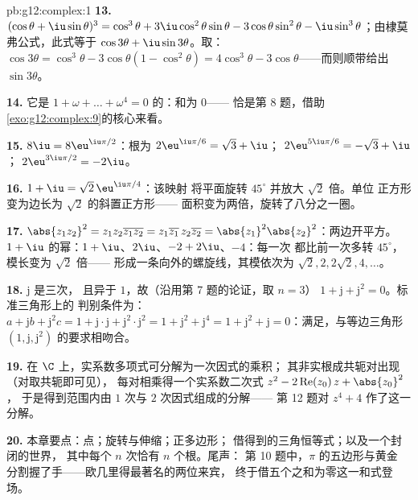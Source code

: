 \begin{solution}{pb:g12:complex:1}
\textbf{13.} $(\cos\theta + \iu\sin\theta)^3 = \cos^3\theta +
3\iu\cos^2\theta\sin\theta - 3\cos\theta\sin^2\theta -
\iu\sin^3\theta$；由棣莫弗公式，此式等于
$\cos 3\theta + \iu \sin 3\theta$。取：
$\cos 3\theta = \cos^3\theta - 3\cos\theta(1 - \cos^2\theta)
= 4\cos^3\theta - 3\cos\theta$——而则顺带给出
$\sin 3\theta$。

\textbf{14.} 它是
$1 + \omega + \dots + \omega^4 = 0$ 的：和为 $0$——
恰是第 8 题，借助
\cref{exo:g12:complex:9}的核心来看。

\textbf{15.} $8\iu = 8\eu^{\iu\pi/2}$：根为
$2\eu^{\iu\pi/6} = \sqrt3 + \iu$；
$2\eu^{5\iu\pi/6} = -\sqrt3 + \iu$；
$2\eu^{3\iu\pi/2} = -2\iu$。

\textbf{16.} $1 + \iu = \sqrt2\,\eu^{\iu\pi/4}$：该映射
将平面旋转 $45^\circ$ 并放大 $\sqrt2$ 倍。单位
正方形变为边长为 $\sqrt2$ 的斜置正方形——
面积变为两倍，旋转了八分之一圈。

\textbf{17.} $\abs{z_1 z_2}^2 = z_1 z_2 \overline{z_1 z_2} =
z_1\overline{z_1}\, z_2\overline{z_2} =
\abs{z_1}^2\abs{z_2}^2$：两边开平方。
$1 + \iu$ 的幂：$1 + \iu$、$2\iu$、$-2 + 2\iu$、$-4$：每一次
都比前一次多转 $45^\circ$，模长变为 $\sqrt2$ 倍——
形成一条向外的螺旋线，其模依次为
$\sqrt2, 2, 2\sqrt2, 4, \dots$。

\textbf{18.} $\mathrm{j}$ 是三次，
且异于 $1$，故（沿用第 7 题的论证，取 $n = 3$）
$1 + \mathrm{j} + \mathrm{j}^2 = 0$。标准三角形上的
判别条件为：$a + \mathrm{j}b + \mathrm{j}^2 c = 1 +
\mathrm{j}\cdot\mathrm{j} + \mathrm{j}^2 \cdot \mathrm{j}^2 =
1 + \mathrm{j}^2 + \mathrm{j}^4 = 1 + \mathrm{j}^2 +
\mathrm{j} = 0$：满足，与等边三角形
$\left(1, \mathrm{j}, \mathrm{j}^2\right)$ 的要求相吻合。

\textbf{19.} 在 $\C$ 上，实系数多项式可分解为一次因式的乘积；
其非实根成共轭对出现（对取共轭即可见），
每对相乘得一个实系数二次式
$z^2 - 2\operatorname{Re}(z_0)\,z + \abs{z_0}^2$，
于是得到范围内由 $1$ 次与 $2$ 次因式组成的分解——
第 12 题对 $z^4 + 4$ 作了这一分解。

\textbf{20.} 本章要点：点；旋转与伸缩；正多边形；
借得到的三角恒等式；以及一个封闭的世界，
其中每个 $n$ 次恰有 $n$ 个根。尾声：
第 10 题中，$\pi$ 的五边形与黄金
分割握了手——欧几里得最著名的两位来宾，
终于借五个之和为零这一和式登场。
\end{solution}
